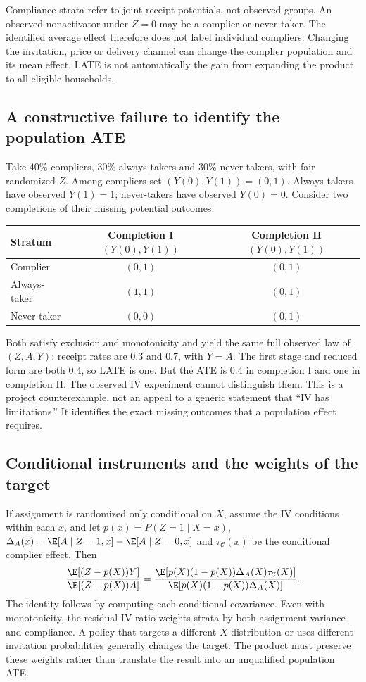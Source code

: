 Compliance strata refer to joint receipt potentials, not observed groups.
An observed nonactivator under $Z=0$ may be a complier or never-taker.
The identified average effect therefore does not label individual
compliers. Changing the invitation, price or delivery channel can change
the complier population and its mean effect. LATE is not automatically
the gain from expanding the product to all eligible households.

\subsection{A constructive failure to identify the population ATE}
Take $40\%$ compliers, $30\%$ always-takers and $30\%$ never-takers,
with fair randomized $Z$. Among compliers set $(Y(0),Y(1))=(0,1)$.
Always-takers have observed $Y(1)=1$; never-takers have observed $Y(0)=0$.
Consider two completions of their missing potential outcomes:
\begin{center}
\begin{tabular}{lcc}
\toprule
Stratum & Completion I $(Y(0),Y(1))$ & Completion II $(Y(0),Y(1))$\\
\midrule
Complier & $(0,1)$ & $(0,1)$\\
Always-taker & $(1,1)$ & $(0,1)$\\
Never-taker & $(0,0)$ & $(0,1)$\\
\bottomrule
\end{tabular}
\end{center}
Both satisfy exclusion and monotonicity and yield the same full observed
law of $(Z,A,Y)$: receipt rates are $0.3$ and $0.7$, with $Y=A$.
The first stage and reduced form are both $0.4$, so LATE is one. But
the ATE is $0.4$ in completion I and one in completion II. The observed
IV experiment cannot distinguish them. This is a project counterexample,
not an appeal to a generic statement that ``IV has limitations.'' It
identifies the exact missing outcomes that a population effect requires.

\subsection{Conditional instruments and the weights of the target}
If assignment is randomized only conditional on $X$, assume the IV
conditions within each $x$, and let $p(x)=P(Z=1\mid X=x)$,
$\Delta_A(x)=\E[A\mid Z=1,x]-\E[A\mid Z=0,x]$ and
$\tau_{\mathcal C}(x)$ be the conditional complier effect. Then
\[
 \frac{\E[(Z-p(X))Y]}{\E[(Z-p(X))A]}
 =\frac{\E[p(X)(1-p(X))\Delta_A(X)\tau_{\mathcal C}(X)]}
        {\E[p(X)(1-p(X))\Delta_A(X)]}.
\]
The identity follows by computing each conditional covariance. Even with
monotonicity, the residual-IV ratio weights strata by both assignment
variance and compliance. A policy that targets a different $X$ distribution
or uses different invitation probabilities generally changes the target.
The product must preserve these weights rather than translate the result
into an unqualified population ATE.

